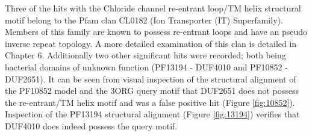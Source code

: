Three of the hits with the Chloride channel re-entrant loop/TM helix structural motif belong to the Pfam clan CL0182 (Ion Transporter (IT) Superfamily).  Members of this family are known to possess re-entrant loops and have an pseudo inverse repeat topology.  A more detailed examination of this clan is detailed in Chapter 6.  Additionally two other significant hits were recorded; both being bacterial domains of unknown function (PF13194 - DUF4010 and PF10852 - DUF2651).  It can be seen from visual inspection of the structural alignment of the PF10852 model and the 3ORG query motif that DUF2651 does not possess the re-entrant/TM helix motif and was a false positive hit (Figure \ref{fig:10852}).  Inspection of the PF13194 structural alignment (Figure \ref{fig:13194}) verifies that DUF4010 does indeed possess the query motif.


